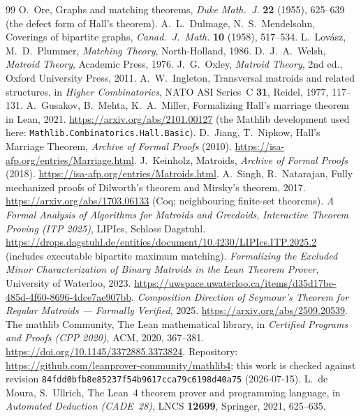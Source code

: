 \documentclass[11pt]{article}
\newcommand{\lean}[1]{\texttt{#1}}
\begin{document}
\begin{thebibliography}{99}
 O.~Ore, Graphs and matching theorems, \emph{Duke Math.\ J.} \textbf{22} (1955),
625--639 (the defect form of Hall's theorem).
 A.~L.~Dulmage, N.~S.~Mendelsohn, Coverings of bipartite graphs, \emph{Canad.\ J.\
Math.} \textbf{10} (1958), 517--534.
 L.~Lov\'asz, M.~D.~Plummer, \emph{Matching Theory}, North-Holland, 1986.
\bibitem{welsh} D.~J.~A.~Welsh, \emph{Matroid Theory}, Academic Press, 1976.
\bibitem{oxley} J.~G.~Oxley, \emph{Matroid Theory}, 2nd ed., Oxford University Press, 2011.
\bibitem{ingleton} A.~W.~Ingleton, Transversal matroids and related structures, in \emph{Higher
Combinatorics}, NATO ASI Series~C \textbf{31}, Reidel, 1977, 117--131.
\bibitem{gusakov} A.~Gusakov, B.~Mehta, K.~A.~Miller, Formalizing Hall's marriage theorem in Lean,
2021. \url{https://arxiv.org/abs/2101.00127} (the Mathlib development used here:
\lean{Mathlib.Combinatorics.Hall.Basic}).
 D.~Jiang, T.~Nipkow, Hall's Marriage Theorem, \emph{Archive of Formal Proofs}
(2010). \url{https://isa-afp.org/entries/Marriage.html}.
 J.~Keinholz, Matroids, \emph{Archive of Formal Proofs} (2018).
\url{https://isa-afp.org/entries/Matroids.html}.
 A.~Singh, R.~Natarajan, Fully mechanized proofs of Dilworth's theorem and
Mirsky's theorem, 2017. \url{https://arxiv.org/abs/1703.06133} (Coq; neighbouring finite-set
theorems).
 \emph{A Formal Analysis of Algorithms for Matroids and Greedoids},
\emph{Interactive Theorem Proving (ITP 2025)}, LIPIcs, Schloss Dagstuhl.
\url{https://drops.dagstuhl.de/entities/document/10.4230/LIPIcs.ITP.2025.2} (includes executable
bipartite maximum matching).
 \emph{Formalizing the Excluded Minor Characterization of Binary Matroids
in the Lean Theorem Prover}, University of Waterloo, 2023.
\url{https://uwspace.uwaterloo.ca/items/d35d17be-485d-4f60-8696-4dce7ae907bb}.
\bibitem{seymour} \emph{Composition Direction of Seymour's Theorem for Regular Matroids ---
Formally Verified}, 2025. \url{https://arxiv.org/abs/2509.20539}.
\bibitem{mathlib} The mathlib Community, The Lean mathematical library, in \emph{Certified
Programs and Proofs (CPP 2020)}, ACM, 2020, 367--381.
\url{https://doi.org/10.1145/3372885.3373824}. Repository:
\url{https://github.com/leanprover-community/mathlib4}; this work is checked against revision
\lean{84fdd0bfb8e85237f54b9617cca79c6198d40a75} (2026-07-15).
 L.~de Moura, S.~Ullrich, The Lean~4 theorem prover and programming language, in
\emph{Automated Deduction (CADE~28)}, LNCS \textbf{12699}, Springer, 2021, 625--635.

\end{thebibliography}
\end{document}
